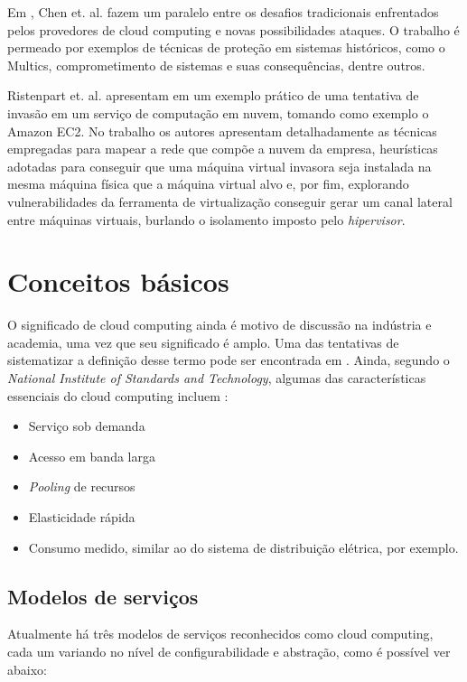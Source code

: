 \documentclass[brazil,12pt]{article}
\begin{document}
Em \cite{whats-new-about-cloud-security}, Chen et. al. fazem um paralelo entre
os desafios tradicionais enfrentados pelos provedores de cloud computing e novas
possibilidades ataques. O trabalho é permeado por exemplos de técnicas de
proteção em sistemas históricos, como o Multics, comprometimento de sistemas e
suas consequências, dentre outros.

Ristenpart et. al. apresentam em \cite{hey-you-get-off-of-my-cloud} um
exemplo prático de uma tentativa de invasão em um serviço de computação em
nuvem, tomando como exemplo o Amazon EC2. No trabalho os autores apresentam
detalhadamente as técnicas empregadas para mapear a rede que compõe a nuvem da
empresa, heurísticas adotadas para conseguir que uma máquina virtual invasora
seja instalada na mesma máquina física que a máquina virtual alvo e, por fim,
explorando vulnerabilidades da ferramenta de virtualização conseguir gerar um
canal lateral entre máquinas virtuais, burlando o isolamento imposto pelo
\emph{hipervisor}. 

\section{Conceitos básicos}
O significado de cloud computing ainda é motivo de discussão na indústria e
academia, uma vez que seu significado é amplo. Uma das tentativas de
sistematizar a definição desse termo pode ser encontrada em \cite{above-clouds}.
Ainda, segundo o \emph{National Institute of Standards and Technology}, algumas
das características essenciais do cloud computing incluem
\cite{nist-definition-cloud-computing}:

\begin{itemize}
  \item Serviço sob demanda
  \item Acesso em banda larga
  \item \emph{Pooling} de recursos
  \item Elasticidade rápida
  \item Consumo medido, similar ao do sistema de distribuição elétrica, por
  exemplo.
\end{itemize}

\subsection{Modelos de serviços}
Atualmente há três modelos de serviços reconhecidos como cloud computing, cada
um variando no nível de configurabilidade e abstração, como é possível ver
abaixo:
\end{document}
